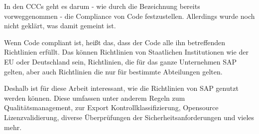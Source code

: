 \documentclass[../main.tex]{subfiles}
\begin{document}
In den \glspl{CCC} geht es darum - wie durch die Bezeichnung bereits vorweggenommen - die Compliance von Code festzustellen. Allerdings wurde noch nicht geklärt, was damit gemeint ist.

Wenn Code compliant ist, heißt das, dass der Code alle ihn betreffenden Richtlinien erfüllt.
Das können Richtlinien von Staatlichen Institutionen wie der \acrshort{EU} oder Deutschland sein, Richtlinien, die für das ganze Unternehmen SAP gelten, aber auch Richtlinien die nur für bestimmte Abteilungen gelten.

Deshalb ist für diese Arbeit interessant, wie die Richtlinien von SAP genutzt werden können.
Diese umfassen unter anderem Regeln zum Qualitätsmanagement, zur Export Kontrollklassifizierung, Opensource Lizenzvalidierung, diverse Überprüfungen der Sicherheitsanforderungen und vieles mehr.
\end{document}
